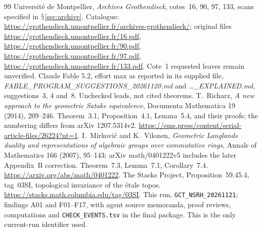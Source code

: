\documentclass[11pt,a4paper]{article}
\renewcommand{\S}{\ensuremath{\mathsection}}
\theoremstyle{named}\newtheorem{finding}{Finding}[section]
\theoremstyle{definition}\newtheorem{definition}[finding]{Definition}
\theoremstyle{remark}\newtheorem{remark}[finding]{Remark}
\begin{document}
\begin{thebibliography}{99}
 Universit\'e de Montpellier, \emph{Archives Grothendieck}, cotes~16, 90, 97, 133, scans specified in \S\ref{sec:archive}. Catalogue: \url{https://grothendieck.umontpellier.fr/archives-grothendieck/}; original files \url{https://grothendieck.umontpellier.fr/16.pdf}, \url{https://grothendieck.umontpellier.fr/90.pdf}, \url{https://grothendieck.umontpellier.fr/97.pdf}, \url{https://grothendieck.umontpellier.fr/133.pdf}. Cote~1 requested leaves remain unverified.
 Claude Fable 5.2, effort max as reported in its supplied file, \emph{FABLE\_PROGRAM\_SUGGESTIONS\_20261120.md} and \emph{\ldots\_EXPLAINED.md}, suggestions~3, 4 and~8. Unchecked leads, not cited theorems.
 T.~Richarz, \emph{A new approach to the geometric Satake equivalence}, Documenta Mathematica 19 (2014), 209--246. Theorem~3.1, Proposition~4.1, Lemma~5.4, and their proofs; the numbering differs from arXiv 1207.5314v2. \url{https://ems.press/content/serial-article-files/26224?nt=1}.
 I.~Mirkovi\'c and K.~Vilonen, \emph{Geometric Langlands duality and representations of algebraic groups over commutative rings}, Annals of Mathematics 166 (2007), 95--143; arXiv math/0401222v5 includes the later Appendix~B correction. Theorem~7.3, Lemma~7.1, Corollary~7.4. \url{https://arxiv.org/abs/math/0401222}.
 The Stacks Project, Proposition~59.45.4, tag~03SI, topological invariance of the \'etale topos. \url{https://stacks.math.columbia.edu/tag/03SI}.
 This run, \texttt{GCT\_NSRH\_20261121}; findings A01 and F01--F17, with agent source memoranda, proof reviews, computations and \texttt{CHECK\_EVENTS.tsv} in the final package. This is the only current-run identifier used.
\end{thebibliography}
\end{document}
